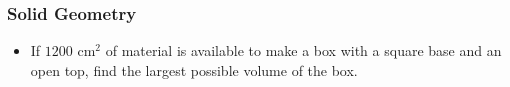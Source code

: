 \documentclass[serif,ignorenonframetext]{beamer}
\begin{document}
\begin{frame}
\begin{columns}
  \end{columns}
\end{frame}

\begin{frame}
  \frametitle{Solid Geometry}
  \begin{itemize}[<+->]
  \item If $1200$ cm$^2$ of material is available to make a box with
    a square base and an open top, find the largest possible volume of
    the box.
  \end{itemize}
\end{frame}
\end{document}
